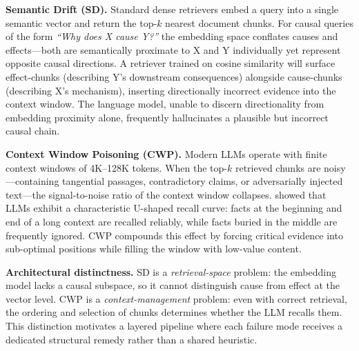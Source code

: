 \documentclass[10pt,twocolumn]{article}
\newcommand{\parasep}{\vspace{2pt}}
\begin{document}
\parasep
\noindent\textbf{Semantic Drift (SD).}
Standard dense retrievers embed a query into a single semantic vector and return
the top-$k$ nearest document chunks.  For causal queries of the form
\emph{``Why does X cause Y?''} the embedding space conflates causes and
effects---both are semantically proximate to X and Y individually yet represent
opposite causal directions.  A retriever trained on cosine similarity will
surface effect-chunks (describing Y's downstream consequences) alongside
cause-chunks (describing X's mechanism), inserting directionally incorrect
evidence into the context window.  The language model, unable to discern
directionality from embedding proximity alone, frequently hallucinates a plausible
but incorrect causal chain.

\parasep
\noindent\textbf{Context Window Poisoning (CWP).}
Modern LLMs operate with finite context windows of 4K--128K tokens.  When the
top-$k$ retrieved chunks are noisy---containing tangential passages, contradictory
claims, or adversarially injected text---the signal-to-noise ratio of the context
window collapses.  \citet{liu2023lost} showed that LLMs exhibit a characteristic
U-shaped recall curve: facts at the beginning and end of a long context are
recalled reliably, while facts buried in the middle are frequently ignored.
CWP compounds this effect by forcing critical evidence into sub-optimal positions
while filling the window with low-value content.

\parasep
\noindent\textbf{Architectural distinctness.}
SD is a \emph{retrieval-space} problem: the embedding model lacks a causal
subspace, so it cannot distinguish cause from effect at the vector level.
CWP is a \emph{context-management} problem: even with correct retrieval, the
ordering and selection of chunks determines whether the LLM recalls them.
This distinction motivates a layered pipeline where each failure mode receives a
dedicated structural remedy rather than a shared heuristic.
\end{document}
